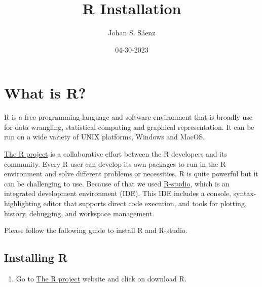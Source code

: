 \documentclass[
  letterpaper,
  DIV=11,
  numbers=noendperiod]{scrartcl}
\title{R Installation}
\author{Johan S. Sáenz}
\date{04-30-2023}
\providecommand{\tightlist}{%
  \setlength{\itemsep}{0pt}\setlength{\parskip}{0pt}}\usepackage{longtable,booktabs,array}
\renewcommand*\contentsname{Table of contents}
\newcommand\contentsname{Table of contents}
\begin{document}
\maketitle
\ifdefined\Shaded\renewenvironment{Shaded}{\begin{tcolorbox}[sharp corners, borderline west={3pt}{0pt}{shadecolor}, interior hidden, boxrule=0pt, enhanced, breakable, frame hidden]}{\end{tcolorbox}}\fi

\renewcommand*\contentsname{Table of contents}
{
\hypersetup{linkcolor=}
\setcounter{tocdepth}{3}
\tableofcontents
}
\hypertarget{what-is-r}{%
\section{\texorpdfstring{\textbf{What is
R?}}{What is R?}}\label{what-is-r}}

R is a free programming language and software environment that is
broadly use for data wrangling, statistical computing and graphical
representation. It can be run on a wide variety of UNIX platforms,
Windows and MacOS.

\href{https://www.r-project.org}{The R project} is a collaborative
effort between the R developers and its community. Every R user can
develop its own packages to run in the R environment and solve different
problems or necessities. R is quite powerful but it can be challenging
to use. Because of that we used
\href{https://posit.co/download/rstudio-desktop/}{R-studio}, which is an
integrated development environment (IDE). This IDE includes a console,
syntax-highlighting editor that supports direct code execution, and
tools for plotting, history, debugging, and workspace management.

Please follow the following guide to install R and R-studio.

\hypertarget{installing-r}{%
\subsection{Installing R}\label{installing-r}}

\begin{enumerate}
\def\labelenumi{\arabic{enumi}.}
\tightlist
\item
  Go to \href{https://www.r-project.org}{The R project} website and
  click on download R.
\end{enumerate}
\end{document}
